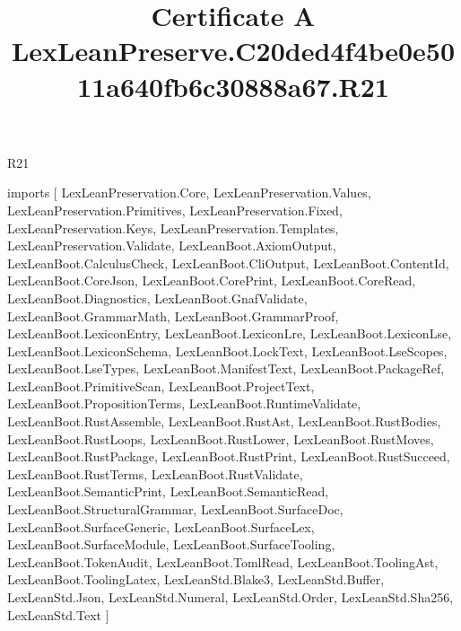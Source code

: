 \begin{lexlean}{R21}
\title{Certificate A LexLeanPreserve.C20ded4f4be0e5011a640fb6c30888a67.R21}
\begin{coremodule}
imports [
  LexLeanPreservation.Core,
  LexLeanPreservation.Values,
  LexLeanPreservation.Primitives,
  LexLeanPreservation.Fixed,
  LexLeanPreservation.Keys,
  LexLeanPreservation.Templates,
  LexLeanPreservation.Validate,
  LexLeanBoot.AxiomOutput,
  LexLeanBoot.CalculusCheck,
  LexLeanBoot.CliOutput,
  LexLeanBoot.ContentId,
  LexLeanBoot.CoreJson,
  LexLeanBoot.CorePrint,
  LexLeanBoot.CoreRead,
  LexLeanBoot.Diagnostics,
  LexLeanBoot.GnafValidate,
  LexLeanBoot.GrammarMath,
  LexLeanBoot.GrammarProof,
  LexLeanBoot.LexiconEntry,
  LexLeanBoot.LexiconLre,
  LexLeanBoot.LexiconLse,
  LexLeanBoot.LexiconSchema,
  LexLeanBoot.LockText,
  LexLeanBoot.LseScopes,
  LexLeanBoot.LseTypes,
  LexLeanBoot.ManifestText,
  LexLeanBoot.PackageRef,
  LexLeanBoot.PrimitiveScan,
  LexLeanBoot.ProjectText,
  LexLeanBoot.PropositionTerms,
  LexLeanBoot.RuntimeValidate,
  LexLeanBoot.RustAssemble,
  LexLeanBoot.RustAst,
  LexLeanBoot.RustBodies,
  LexLeanBoot.RustLoops,
  LexLeanBoot.RustLower,
  LexLeanBoot.RustMoves,
  LexLeanBoot.RustPackage,
  LexLeanBoot.RustPrint,
  LexLeanBoot.RustSucceed,
  LexLeanBoot.RustTerms,
  LexLeanBoot.RustValidate,
  LexLeanBoot.SemanticPrint,
  LexLeanBoot.SemanticRead,
  LexLeanBoot.StructuralGrammar,
  LexLeanBoot.SurfaceDoc,
  LexLeanBoot.SurfaceGeneric,
  LexLeanBoot.SurfaceLex,
  LexLeanBoot.SurfaceModule,
  LexLeanBoot.SurfaceTooling,
  LexLeanBoot.TokenAudit,
  LexLeanBoot.TomlRead,
  LexLeanBoot.ToolingAst,
  LexLeanBoot.ToolingLatex,
  LexLeanStd.Blake3,
  LexLeanStd.Buffer,
  LexLeanStd.Json,
  LexLeanStd.Numeral,
  LexLeanStd.Order,
  LexLeanStd.Sha256,
  LexLeanStd.Text
]


\end{coremodule}
\end{lexlean}
